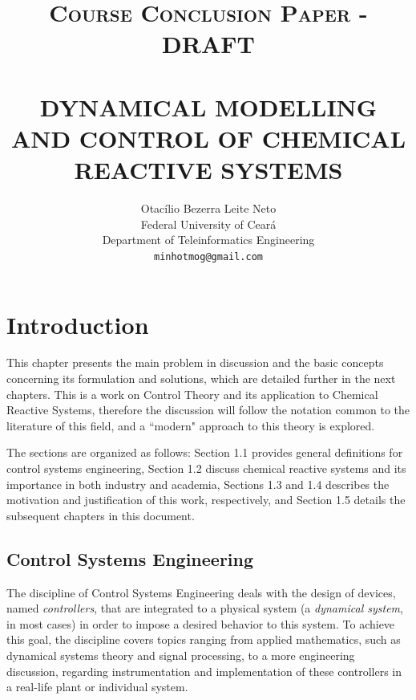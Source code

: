 \documentclass[a4paper,11pt]{book}
\title{ \normalsize \textsc{Course Conclusion Paper - DRAFT} 
        \\[2.0cm]             
        \HRule{0.5pt} \\              
        \LARGE \textbf{\uppercase{Dynamical Modelling and Control of Chemical Reactive Systems}}
        \HRule{2pt} \\[0.5cm]  
}
\author{
        Otacílio Bezerra Leite Neto\\   
        Federal University of Ceará\\  
        Department of Teleinformatics Engineering\\
        \texttt{minhotmog@gmail.com} \\
}
\makeatletter
\numberwithin{figure}{chapter}
\numberwithin{equation}{chapter}
\numberwithin{table}{chapter}
\theoremstyle{definition}
\def\printtitle{
    {\centering \@title\par}}
\def\printauthor{
    {\centering \large \@author}}
\makeatother
\begin{document}
\thispagestyle{empty}       %

\printtitle                 %
    \vfill
\printauthor                %
\newpage

\thispagestyle{empty}   
\tableofcontents

\clearpage
\setcounter{page}{1}
\chapter{Introduction}

This chapter presents the main problem in discussion and the basic concepts concerning its formulation and solutions, which are detailed further in the next chapters. This is a work on Control Theory and its application to Chemical Reactive Systems, therefore the discussion will follow the notation common to the literature of this field, and a ``modern" approach to this theory is explored. 

The sections are organized as follows: Section 1.1 provides general definitions for control systems engineering, Section 1.2 discuss chemical reactive systems and its importance in both industry and academia, Sections 1.3 and 1.4 describes the motivation and justification of this work, respectively, and Section 1.5 details the subsequent chapters in this document.

\section{Control Systems Engineering}

The discipline of Control Systems Engineering deals with the design of devices, named \textit{controllers}, that are integrated to a physical system (a \textit{dynamical system}, in most cases) in order to impose a desired behavior to this system. To achieve this goal, the discipline covers topics ranging from applied mathematics, such as dynamical systems theory and signal processing, to a more engineering discussion, regarding instrumentation and implementation of these controllers in a real-life plant or individual system. 
\end{document}
